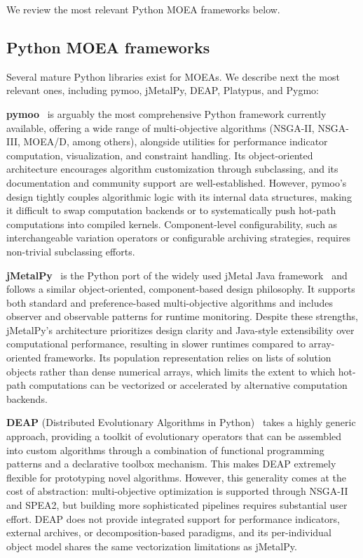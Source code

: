 \documentclass[journal]{IEEEtran}
\begin{document}
We review the most relevant Python MOEA frameworks below.

\subsection{Python MOEA frameworks}
\label{sec:related_frameworks}

Several mature Python libraries exist for MOEAs. We describe next the most relevant ones, including pymoo, jMetalPy, DEAP, Platypus, and Pygmo:

\textbf{pymoo}~\cite{BD20}  is arguably the most comprehensive Python framework currently available, offering a wide range of multi-objective algorithms (NSGA-II, NSGA-III, MOEA/D, among others), alongside utilities for performance indicator computation, visualization, and constraint handling. Its object-oriented architecture encourages algorithm customization through subclassing, and its documentation and community support are well-established. However, pymoo's design tightly couples algorithmic logic with its internal data structures, making it difficult to swap computation backends or to systematically push hot-path computations into compiled kernels. Component-level configurability, such as interchangeable variation operators or configurable archiving strategies, requires non-trivial subclassing efforts.

\textbf{jMetalPy}~\cite{BNG+19} is the Python port of the widely used jMetal Java framework~\cite{DN11} and follows a similar object-oriented, component-based design philosophy. It supports both standard and preference-based multi-objective algorithms and includes observer and observable patterns for runtime monitoring. Despite these strengths, jMetalPy's architecture prioritizes design clarity and Java-style extensibility over computational performance, resulting in slower runtimes compared to array-oriented frameworks. Its population representation relies on lists of solution objects rather than dense numerical arrays, which limits the extent to which hot-path computations can be vectorized or accelerated by alternative computation backends.

\textbf{DEAP} (Distributed Evolutionary Algorithms in Python)~\cite{FDG+12} takes a highly generic approach, providing a toolkit of evolutionary operators that can be assembled into custom algorithms through a combination of functional programming patterns and a declarative toolbox mechanism. This makes DEAP extremely flexible for prototyping novel algorithms. However, this generality comes at the cost of abstraction: multi-objective optimization is supported through NSGA-II and SPEA2, but building more sophisticated pipelines requires substantial user effort. DEAP does not provide integrated support for performance indicators, external archives, or decomposition-based paradigms, and its per-individual object model shares the same vectorization limitations as jMetalPy.
\end{document}
